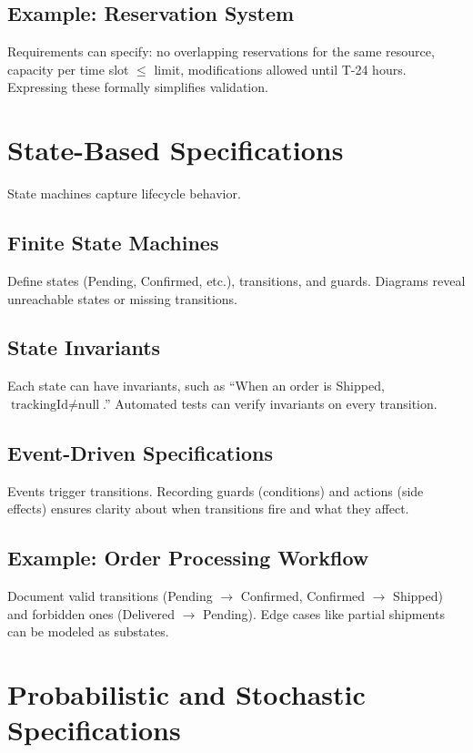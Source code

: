 \subsection{Example: Reservation System}
Requirements can specify: no overlapping reservations for the same resource, capacity per time slot $\le$ limit, modifications allowed until T-24 hours. Expressing these formally simplifies validation.

\section{State-Based Specifications}
\label{sec:state-based}

State machines capture lifecycle behavior.

\subsection{Finite State Machines}
Define states (Pending, Confirmed, etc.), transitions, and guards. Diagrams reveal unreachable states or missing transitions.

\subsection{State Invariants}
Each state can have invariants, such as ``When an order is Shipped, $\text{trackingId} \neq \text{null}$.'' Automated tests can verify invariants on every transition.

\subsection{Event-Driven Specifications}
Events trigger transitions. Recording guards (conditions) and actions (side effects) ensures clarity about when transitions fire and what they affect.

\subsection{Example: Order Processing Workflow}
Document valid transitions (Pending $\rightarrow$ Confirmed, Confirmed $\rightarrow$ Shipped) and forbidden ones (Delivered $\rightarrow$ Pending). Edge cases like partial shipments can be modeled as substates.

\section{Probabilistic and Stochastic Specifications}
\label{sec:probabilistic}

